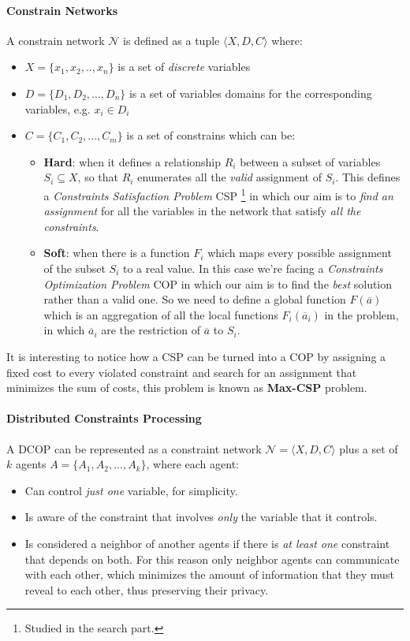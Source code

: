 \documentclass[10pt,a4paper]{article}
\begin{document}
\paragraph{Constrain Networks}
A constrain network $\mathcal{N}$ is defined as a tuple $\langle X,D,C\rangle$ where:
\begin{itemize}
\item $X=\{x_1,x_2,..,x_n\}$ is a set of \textit{discrete} variables
\item $D=\{D_1,D_2,...,D_n\}$ is a set of variables domains for the corresponding variables, e.g. $x_i \in D_i$
\item  $C=\{C_1,C_2,...,C_m\}$ is a set of constrains which can be:

	\begin{itemize}
	\item \textbf{Hard}: when it defines a relationship $R_i$ between a subset of variables $S_i \subseteq X$, so that $R_i$ enumerates all the \textit{valid} assignment of $S_i$. This defines a \textit{Constraints Satisfaction Problem} CSP \footnote{Studied in the search part.} in which our aim is to \textit{find an assignment} for all the variables in the network that satisfy \textit{all the constraints}.
	\item \textbf{Soft}: when there is a function $F_i$ which maps every possible assignment of the subset $S_i$ to a real value. In this case we're facing a \textit{Constraints Optimization Problem} COP in which our aim is to find the \textit{best} solution rather than a valid one. So we need to define a global function $F(\overline{a})$ which is an aggregation of all the local functions $F_i(\overline{a}_i)$ in the problem, in which $\overline{a}_i$ are the restriction of $\overline{a}$ to $S_i$. 
	\end{itemize}
\end{itemize}
It is interesting to notice how a CSP can be turned into a COP by assigning a fixed cost to every violated constraint and search for an assignment that minimizes the sum of costs, this problem is known as \textbf{Max-CSP} problem.



\paragraph{Distributed Constraints Processing}

A DCOP can be represented as a constraint network $\mathcal{N}=\langle X,D,C\rangle$ plus a set of $k$  agents $A=\{A_1,A_2,...,A_k\}$, where each agent:
\begin{itemize}
\item  Can control \textit{just one} variable, for simplicity.
\item Is aware of the constraint that involves \textit{only} the variable that it controls.
\item Is considered a neighbor of another agents if there is \textit{at least one} constraint that depends on both. For this reason only neighbor agents can communicate with each other, which minimizes the amount of information that they must reveal to each other, thus preserving their privacy.
\end{itemize}
\end{document}
